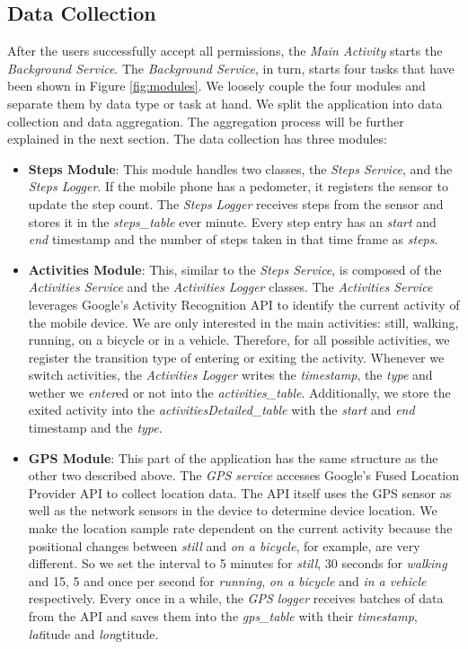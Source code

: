 \subsection{Data Collection}
After the users successfully accept all permissions, the \textit{Main Activity} starts the \textit{Background Service}. The \textit{Background Service}, in turn, starts four tasks that have been shown in Figure \ref{fig:modules}. We loosely couple the four modules and separate them by data type or task at hand. We split the application into data collection and data aggregation. The aggregation process will be further explained in the next section. The data collection has three modules:
\begin{itemize}
    \item \textbf{Steps Module}: This module handles two classes, the \textit{Steps Service}, and the \textit{Steps Logger}. If the mobile phone has a pedometer, it registers the sensor to update the step count. The \textit{Steps Logger} receives steps from the sensor and stores it in the \textit{steps\_table} ever minute. Every step entry has an \textit{start} and \textit{end} timestamp and the number of steps taken in that time frame as \textit{steps}.
    \item \textbf{Activities Module}: This, similar to the \textit{Steps Service}, is composed of the \textit{ Activities Service} and the \textit{Activities Logger} classes. The \textit{ Activities Service} leverages Google's Activity Recognition API to identify the current activity of the mobile device. We are only interested in the main activities: still, walking, running, on a bicycle or in a vehicle. Therefore, for all possible activities, we register the transition type of entering or exiting the activity. Whenever we switch activities, the \textit{Activities Logger} writes the \textit{timestamp}, the \textit{type} and wether we \textit{enter}ed or not into the \textit{activities\_table}. Additionally, we store the exited activity into the \textit{activitiesDetailed\_table} with the \textit{start} and \textit{end} timestamp and the \textit{type}.
     \item \textbf{GPS Module}: This part of the application has the same structure as the other two described above. The \textit{GPS service} accesses Google's Fused Location Provider API to collect location data. The API itself uses the GPS sensor as well as the network sensors in the device to determine device location. We make the location sample rate dependent on the current activity because the positional changes between \textit{still} and \textit{on a bicycle}, for example, are very different. So we set the interval to 5 minutes for \textit{still}, 30 seconds for \textit{walking} and 15, 5 and once per second for \textit{running}, \textit{on a bicycle} and \textit{in a vehicle} respectively. Every once in a while, the \textit{GPS logger} receives batches of data from the API and saves them into the \textit{gps\_table} with their  \textit{timestamp}, \textit{lat}itude and \textit{lon}gtitude.
\end{itemize}

